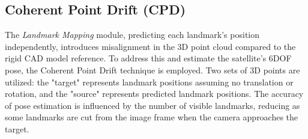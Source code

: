 \subsection{Coherent Point Drift (CPD)}
The \textit{Landmark Mapping} module, predicting each landmark's position independently, introduces misalignment in the 3D point cloud compared to the rigid CAD model reference. To address this and estimate the satellite's 6DOF pose, the Coherent Point Drift technique is employed. Two sets of 3D points are utilized: the "target" represents landmark positions assuming no translation or rotation, and the "source" represents predicted landmark positions. The accuracy of pose estimation is influenced by the number of visible landmarks, reducing as some landmarks are cut from the image frame when the camera approaches the target.
\begin{table}[ht]
\centering
{}
    \caption{\label{tab1}Results on train set with multi and single model configurations.}
\end{table}

\begin{table}[ht]
\centering
{}
    
    \caption{\label{tab2}Results on test set with multi-model configuration.}
\end{table}

